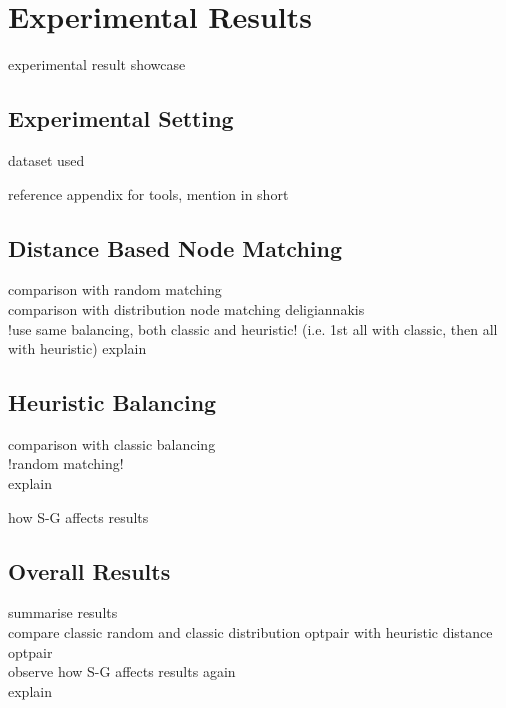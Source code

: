 \chapter{Experimental Results} \label{chap:expRes}

experimental result showcase

\section{Experimental Setting} \label{sec:expRes-setting}

dataset used

reference appendix for tools, mention in short

\section{Distance Based Node Matching} \label{sec:expRes-distNodeMatch}

comparison with random matching\\
comparison with distribution node matching deligiannakis\\
!use same balancing, both classic and heuristic! (i.e. 1st all with classic, then all with heuristic)
explain

\section{Heuristic Balancing} \label{sec:expRes-heuristic}

comparison with classic balancing\\
!random matching!\\
explain

how S-G affects results

\section{Overall Results} \label{sec:expRes-overall}

summarise results\\
compare classic random and classic distribution optpair with heuristic distance optpair\\
observe how S-G affects results again\\

explain